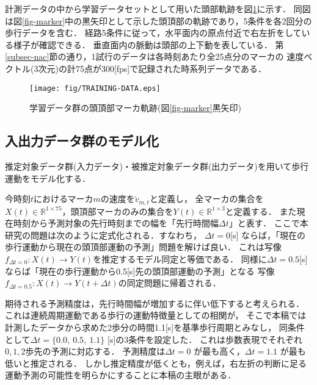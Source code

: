 \documentclass{sigchi}
\begin{document}
計測データの中から学習データセットとして用いた頭部軌跡を図\ref{fig-training-data}に示す．
同図は図\ref{fig-marker}中の黒矢印として示した頭頂部の軌跡であり，5条件を各2回分の歩行データを含む．
経路5条件に従って，水平面内の原点付近で右左折をしている様子が確認できる．
垂直面内の脈動は頭部の上下動を表している．
第\ref{subsec-nac}節の通り，1試行のデータは各時刻あたり全25点分のマーカの
速度ベクトル(3次元)の計75点が300[fps]で記録された時系列データである．

\begin{figure}[tb]
  \begin{center}
    \texttt{[image: fig/TRAINING-DATA.eps]}
  \end{center}
  \vspace*{-10mm}
  \caption{学習データ群の頭頂部マーカ軌跡(図\ref{fig-marker}黒矢印)}
  \label{fig-training-data}
\end{figure}




\subsection{入出力データ群のモデル化}
\label{projection}

推定対象データ群(入力データ)・被推定対象データ群(出力データ)を用いて歩行運動をモデル化する．

今時刻$t$におけるマーカ$m$の速度を$\check{v}_{m,t} $と定義し，
全マーカの集合を$X(t) \in \mathbb{R}^{1 \times 75}$，頭頂部マーカのみの集合を$Y(t) \in \mathbb{R}^{1 \times 3}$と定義する．
また現在時刻から予測対象の先行時刻までの幅を「先行時間幅$\Delta t$」と表す．
ここで本研究の問題は次のように定式化される．すなわち，
$\Delta t = 0 $[s] ならば，「現在の歩行運動から現在の頭頂部運動の予測」問題を解けば良い．
これは写像$f_{\Delta t = 0}: X(t) \rightarrow Y(t)$を推定するモデル同定と等価である．
同様に$\Delta t = 0.5 $[s] ならば「現在の歩行運動から0.5[s]先の頭頂部運動の予測」となる
写像$f_{\Delta t = 0.5}: X(t) \rightarrow Y(t+\Delta t)$の同定問題に帰着される．

期待される予測精度は，先行時間幅が増加するに伴い低下すると考えられる．
これは連続周期運動である歩行の運動特徴量としての相関が，
そこで本稿では計測したデータから求めた2歩分の時間1.1[s]を基準歩行周期とみなし，
同条件として$\Delta t = \{0.0, \  0.5, \ 1.1\}$ [s]の3条件を設定した．
これは歩数表現でそれぞれ${0, 1, 2}$歩先の予測に対応する．
予測精度は$\Delta t = 0$ が最も高く，$\Delta t = 1.1$ が最も低いと推定される．
しかし推定精度が低くとも，例えば，右左折の判断に足る運動予測の可能性を明らかにすることに本稿の主眼がある．
\end{document}
